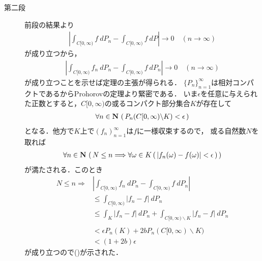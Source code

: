 \begin{sketch}
\begin{description}
			\item[第二段]
				前段の結果より
				\begin{align}
					\left| \int_{C[0,\infty)} f\ dP_n
					- \int_{C[0,\infty)} f\ dP\right|
					\longrightarrow 0 \quad (n \longrightarrow \infty)
				\end{align}
				が成り立つから，
				\begin{align}
					\left|\int_{C[0,\infty)} f_n\ dP_n
					- \int_{C[0,\infty)} f\ dP_n\right|
					\longrightarrow 0 \quad (n \longrightarrow \infty)
					\label{eq:chapter_2_Problem_4_12}
				\end{align}
				が成り立つことを示せば定理の主張が得られる．
				$\{P_n\}_{n=1}^\infty$は相対コンパクトであるからProhorovの定理より緊密である．
				いま$\epsilon$を任意に与えられた正数とすると，$C[0,\infty)$の或るコンパクト部分集合$K$が存在して
				\begin{align}
					\forall n \in \mathbf{N}\, \left(\, P_n(C[0,\infty) \backslash K) < \epsilon\, \right)
				\end{align}
				となる．他方で$K$上で$(f_n)_{n=1}^\infty$は$f$に一様収束するので，
				或る自然数$N$を取れば
				\begin{align}
					\forall n \in \mathbf{N}\, \left(\, N \leq n
					\Longrightarrow \forall \omega \in K\, (\, |f_n(\omega) - f(\omega)| < \epsilon\, )\, \right)
				\end{align}
				が満たされる．このとき
				\begin{align}
					N \leq n \Longrightarrow
					&\left| \int_{C[0,\infty)} f_n\ dP_n
					- \int_{C[0,\infty)} f\ dP_n\right| \\
					&\leq \int_{C[0,\infty)} |f_n - f|\ dP_n \\
					&\leq \int_K |f_n - f|\ dP_n + \int_{C[0,\infty) \backslash K} |f_n - f|\ dP_n \\ \\
					&< \epsilon P_n(K) + 2b P_n(C[0,\infty) \backslash K) \\
					&< (1+2b) \epsilon
				\end{align}
				が成り立つので()が示された．
				\QED
		\end{description}
	\end{sketch}